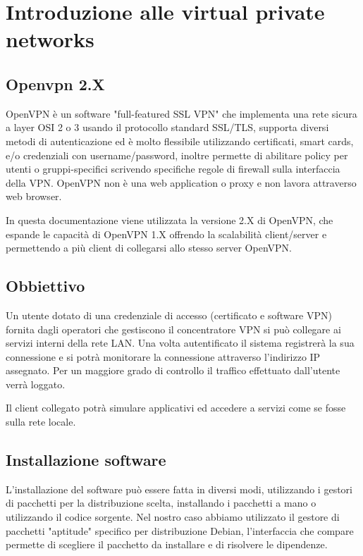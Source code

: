 \chapter{Introduzione alle virtual private networks}  %

\section{Openvpn 2.X}
OpenVPN è un software "full-featured SSL VPN" che implementa una rete sicura a layer OSI 2 o 3 usando il protocollo standard SSL/TLS, supporta diversi metodi di autenticazione ed è molto flessibile utilizzando certificati, smart cards, e/o credenziali con username/password, inoltre permette di abilitare policy per utenti o gruppi-specifici scrivendo specifiche regole di firewall sulla interfaccia della VPN. OpenVPN non è una web application o proxy e non lavora attraverso web browser. 

In questa documentazione viene utilizzata la versione 2.X di OpenVPN, che espande le capacità di OpenVPN 1.X offrendo la scalabilità client/server e permettendo a più client di collegarsi allo stesso server OpenVPN.

\section{Obbiettivo}
Un utente dotato di una credenziale di accesso (certificato e software VPN) fornita dagli operatori che gestiscono il concentratore VPN si può collegare ai servizi interni della rete LAN. Una volta autentificato il sistema registrerà la sua connessione e si potrà monitorare la connessione attraverso l'indirizzo IP assegnato. Per un maggiore grado di controllo il traffico effettuato dall'utente verrà loggato.

Il client collegato potrà simulare applicativi ed accedere a servizi come se fosse sulla rete locale.

\section{Installazione software}
L'installazione del software può essere fatta in diversi modi, utilizzando i gestori di pacchetti per la distribuzione scelta, installando i pacchetti a mano o utilizzando il codice sorgente.
Nel nostro caso abbiamo utilizzato il gestore di pacchetti "aptitude" specifico per distribuzione Debian, l'interfaccia che compare permette di scegliere il pacchetto da installare e di risolvere le dipendenze.

